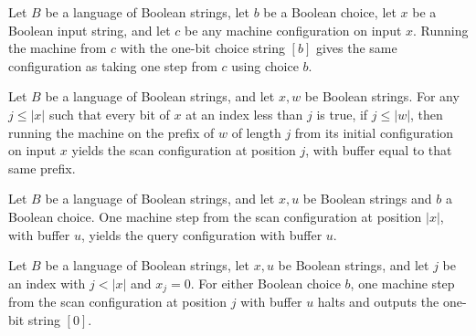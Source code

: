 \begin{theorem}
\label{Complexity.uw_runWith_single}
\leanok
{}
Let $B$ be a language of Boolean strings, let $b$ be a Boolean choice, let $x$ be a
Boolean input string, and let $c$ be any machine configuration on input $x$. Running the
machine from $c$ with the one-bit choice string $[b]$ gives the same configuration as
taking one step from $c$ using choice $b$.
\end{theorem}

\begin{theorem}
\label{Complexity.uw_scan_run}
\leanok
{}
Let $B$ be a language of Boolean strings, and let $x,w$ be Boolean strings. For any
$j\le |x|$ such that every bit of $x$ at an index less than $j$ is true, if $j\le |w|$,
then running the machine on the prefix of $w$ of length $j$ from its initial
configuration on input $x$ yields the scan configuration at position $j$, with buffer
equal to that same prefix.
\end{theorem}

\begin{theorem}
\label{Complexity.uw_end_step}
\leanok
{}
Let $B$ be a language of Boolean strings, and let $x,u$ be Boolean strings and $b$ a
Boolean choice. One machine step from the scan configuration at position $|x|$, with
buffer $u$, yields the query configuration with buffer $u$.
\end{theorem}

\begin{theorem}
\label{Complexity.uw_false_step}
\leanok
{}
Let $B$ be a language of Boolean strings, let $x,u$ be Boolean strings, and let $j$ be
an index with $j<|x|$ and $x_j=0$. For either Boolean choice $b$, one machine step from
the scan configuration at position $j$ with buffer $u$ halts and outputs the one-bit
string $[0]$.
\end{theorem}

